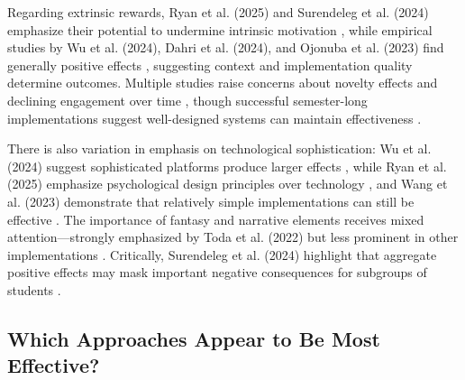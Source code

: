 \documentclass[12pt,a4paper]{article}
\begin{document}
Regarding extrinsic rewards, Ryan et al. (2025) and Surendeleg et al. (2024) emphasize their potential to undermine intrinsic motivation \parencite{ryan2025,surendeleg2024}, while empirical studies by Wu et al. (2024), Dahri et al. (2024), and Ojonuba et al. (2023) find generally positive effects \parencite{wu2024,dahri2024,ojonuba2023}, suggesting context and implementation quality determine outcomes. Multiple studies raise concerns about novelty effects and declining engagement over time \parencite{wu2024,rodriguez2025,toda2022}, though successful semester-long implementations suggest well-designed systems can maintain effectiveness \parencite{rodriguez2025,sevilla2024}.

There is also variation in emphasis on technological sophistication: Wu et al. (2024) suggest sophisticated platforms produce larger effects \parencite{wu2024}, while Ryan et al. (2025) emphasize psychological design principles over technology \parencite{ryan2025}, and Wang et al. (2023) demonstrate that relatively simple implementations can still be effective \parencite{wang2023}. The importance of fantasy and narrative elements receives mixed attention—strongly emphasized by Toda et al. (2022) \parencite{toda2022} but less prominent in other implementations \parencite{rodriguez2025,dahri2024}. Critically, Surendeleg et al. (2024) highlight that aggregate positive effects may mask important negative consequences for subgroups of students \parencite{surendeleg2024}.


\subsection{Which Approaches Appear to Be Most Effective?}
\end{document}
